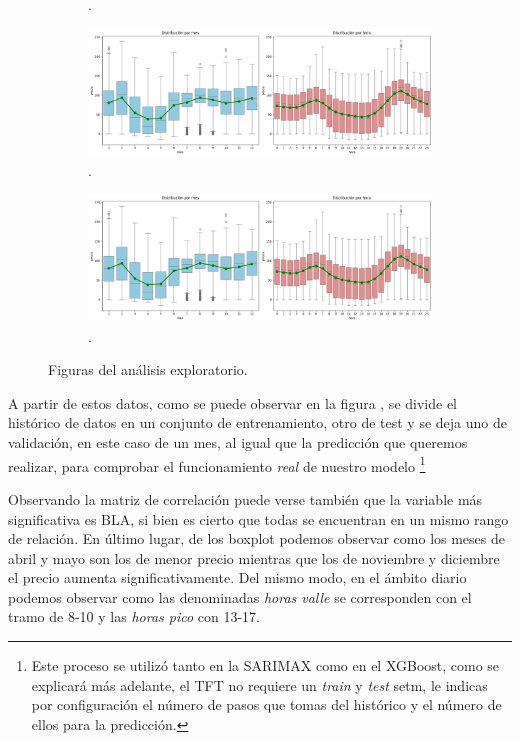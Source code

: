 \begin{figure}[H]
\begin{subfigure}[b]{0.35\textwidth}
\caption[Matriz de correlación]{.}
\label{Matriz de correlacion}
\end{subfigure}
\begin{subfigure}[b]{0.35\textwidth}
\centering
\includegraphics[width=\textwidth]{figuras/boxplots_precios.png}
\caption[Boxplot diario]{.}
\label{Booxplotdiario}
\end{subfigure}
\begin{subfigure}[b]{0.35\textwidth}
\centering
\includegraphics[width=\textwidth]{figuras/boxplots_precios.png}
\caption[Boxplot anual]{.}
\label{Boxplotanual}
\end{subfigure}
\caption{Figuras del análisis exploratorio.}
\label{Análisis exploratorio}
\end{figure}
A partir de estos datos, como se puede observar en la figura , se divide el histórico de datos en un conjunto de entrenamiento, otro de test y se deja uno de validación, en este caso de un mes, al igual que la predicción que queremos realizar, para comprobar el funcionamiento \textit{real} de nuestro modelo \footnote{Este proceso se utilizó tanto en la SARIMAX como en el XGBoost, como se explicará más adelante, el TFT no requiere un \textit{train} y \textit{test} setm, le indicas por configuración el número de pasos que tomas del histórico y el número de ellos para la predicción.}

Observando la matriz de correlación puede verse también que la variable más significativa es BLA, si bien es cierto que todas se encuentran en un mismo rango de relación. En último lugar, de los boxplot podemos observar como los meses de abril y mayo son los de menor precio mientras que los de noviembre y diciembre el precio aumenta significativamente. Del mismo modo, en el ámbito diario podemos observar como las denominadas \textit{horas valle} se corresponden con el tramo de 8-10 y las \textit{horas pico} con 13-17.
%
%
%
